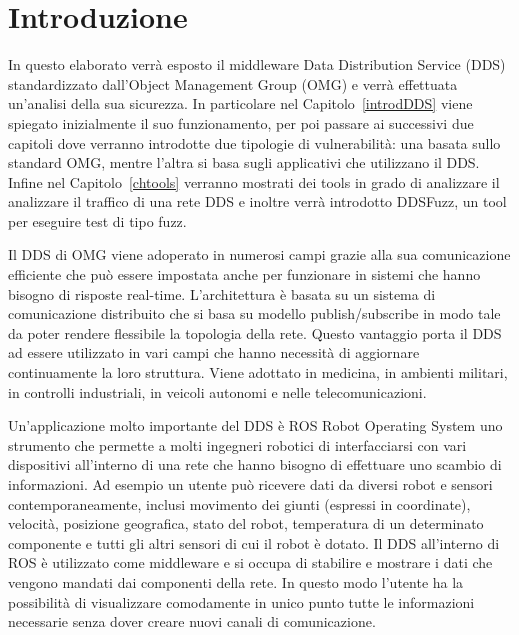\chapter{Introduzione}
In questo elaborato verrà esposto il middleware Data Distribution 
Service (DDS) standardizzato dall'Object Management Group (OMG) e 
verrà effettuata un'analisi della sua sicurezza.
In particolare nel Capitolo~\ref{introdDDS} 
viene spiegato inizialmente 
il suo funzionamento, per poi passare ai successivi due capitoli 
dove verranno introdotte due tipologie di vulnerabilità: una 
basata sullo standard OMG, mentre l'altra si basa sugli applicativi
che utilizzano il DDS. Infine nel Capitolo~\ref{chtools} 
verranno 
mostrati dei tools in grado di analizzare il analizzare 
il traffico di una rete DDS e inoltre verrà introdotto DDSFuzz, 
un tool per eseguire test di tipo fuzz.

Il DDS di OMG viene adoperato in numerosi campi grazie alla 
sua comunicazione efficiente che può essere impostata anche 
per funzionare in sistemi che hanno bisogno di risposte 
real-time. L'architettura è basata su un sistema di comunicazione 
distribuito che si basa su modello publish/subscribe in modo 
tale da poter rendere flessibile la topologia della rete.
Questo vantaggio porta il DDS ad essere utilizzato in vari campi 
che hanno necessità di aggiornare continuamente la loro 
struttura. Viene adottato in medicina, in ambienti militari, 
in controlli industriali, in veicoli autonomi e nelle telecomunicazioni.

Un'applicazione molto importante del DDS è ROS Robot Operating System
uno strumento che permette a molti ingegneri robotici di 
interfacciarsi con vari dispositivi all'interno di una 
rete che hanno bisogno di effettuare uno scambio di informazioni.
Ad esempio un utente può ricevere dati da diversi robot e sensori
contemporaneamente, inclusi 
movimento dei giunti (espressi in coordinate), velocità, 
posizione geografica, stato del robot, temperatura di un 
determinato componente e tutti gli altri sensori di cui il 
robot è dotato. Il DDS all'interno di ROS è utilizzato come 
middleware e si occupa di stabilire e mostrare i dati 
che vengono mandati dai componenti della rete. 
In questo modo l'utente ha la possibilità di visualizzare 
comodamente in unico punto tutte le informazioni necessarie 
senza dover creare nuovi canali di comunicazione.

